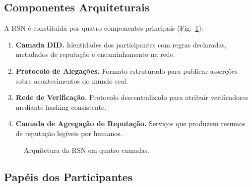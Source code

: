 \documentclass[11pt,a4paper,twocolumn]{article}
\begin{document}
\subsection{Componentes Arquiteturais}

A RSN é constituída por quatro componentes principais (Fig.~\ref{fig:architecture}):
\begin{enumerate}[nosep]
\item \textbf{Camada DID.} Identidades dos participantes com regras declaradas, metadados de reputação e encaminhamento na rede.
\item \textbf{Protocolo de Alegações.} Formato estruturado para publicar asserções sobre acontecimentos do mundo real.
\item \textbf{Rede de Verificação.} Protocolo descentralizado para atribuir verificadores mediante hashing consistente.
\item \textbf{Camada de Agregação de Reputação.} Serviços que produzem resumos de reputação legíveis por humanos.
\end{enumerate}

\begin{figure}[ht]
\centering
{}
\caption{Arquitetura da RSN em quatro camadas.}
\label{fig:architecture}
\end{figure}

\subsection{Papéis dos Participantes}
\end{document}
